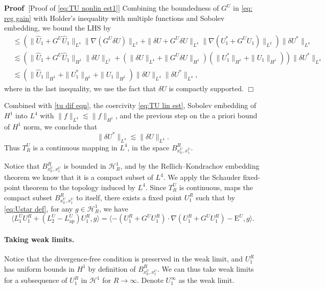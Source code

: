 \documentclass[11pt,a4paper]{article}
\numberwithin{equation}{section}
\newcommand{\Epsilon}{\mathrm{E}}
\newcommand{\tmop}[1]{\ensuremath{\operatorname{#1}}}
\newenvironment{proof}{\noindent\textbf{Proof\ }}{\hspace*{\fill}$\Box$\medskip}
\begin{document}
\begin{proof}[Proof of \eqref{eq:TU nonlin est1}]
     Combining the boundedness of $G^U$ in \eqref{eq: reg gain} with Holder's inequality with multiple functions and Sobolev embedding, we bound the LHS by 
     $$\begin{aligned}
        &\leqslant(\|\widehat{U}_1 + G^{U} \widehat{U}_1\|_{L^4}\|\nabla (G^{U} \delta U)\|_{L^2}+\|\delta U + G^{U} \delta U\|_{L^4}\|\nabla (U_1^{\ast} + G^{U} U_1)\|_{L^2})\|\delta U^{\ast} \|_{L^4}\\&\lesssim(\|\widehat{U}_1 + G^{U} \widehat{U}_1\|_{H^1}\| \delta U\|_{L^2}+(\|\delta U\|_{L^4} + \|G^{U} \delta U\|_{H^1})(\|{U}_1^{\ast}  \|_{H^1}+\| {U}_1\|_{H^1}))\|\delta U^{\ast} \|_{L^4}\\&\lesssim(\|\widehat{U}_1\|_{H^1}+\|{U}_1^{\ast}  \|_{H^1}+\| {U}_1\|_{H^1})\|\delta U \|_{L^4}\|\delta U^{\ast} \|_{L^4},
     \end{aligned}$$
 where in the last inequality, we use the fact that $\delta U$ is compactly supported.
\end{proof}

Combined with \eqref{tu dif eqn}, the coercivity \eqref{eq:TU lin est}, Sobolev embedding of $H^1$ into $L^4$ with $\|f\|_{L^4} \lesssim \|f\|_{H^1}$, and the previous step on the a priori bound of $H^1$ norm, we conclude that 
\[
\|\delta U^{\ast}\|_{L^4} \lesssim \|\delta U\|_{L^4}.
\]
Thus $T^U_R$ is a continuous mapping in $L^4$, in the space $B^R_{x_0^U, x_1^U}$.

Notice that $B^R_{x_0^U, x_1^U}$ is bounded in $\mathcal{H}^1_R$, and by the Rellich–Kondrachov embedding theorem we know that it is a compact subset of $L^4$.
We apply the Schauder fixed-point theorem to the topology induced by $L^4$. Since $T^U_R$ is continuous, maps the compact subset $B^R_{x_0^U, x_1^U}$ to itself, there exists a fixed point $U_1^R$ such that by \eqref{eq:Ustar def}, for any $g\in \mathcal{H}^1_R$, we have 
\begin{equation}  \langle L_1^U U_1^R + (L_2^U - L_{\tmop{ap}}^{U}) U_1^R , g \rangle =  \langle-(U_1^R +
   G^{U} U_1^R) \cdot \nabla   (U_1^R +
   G^{U} U_1^R) - \Epsilon^U,g \rangle.\label{eq:Ufix def}
\end{equation}

\paragraph{Taking weak limits.}
Notice that the divergence-free condition is preserved in the weak limit, and $U_1^R$ has uniform bounds in $H^1$ by definition of $B^R_{x_0^U, x_1^U}$. We can thus take weak limits for a subsequence of $U_1^{R}$ in $\mathcal{H}^1$ for $R\to\infty$. Denote $U_1^{\infty}$ as the weak limit.
\end{document}
